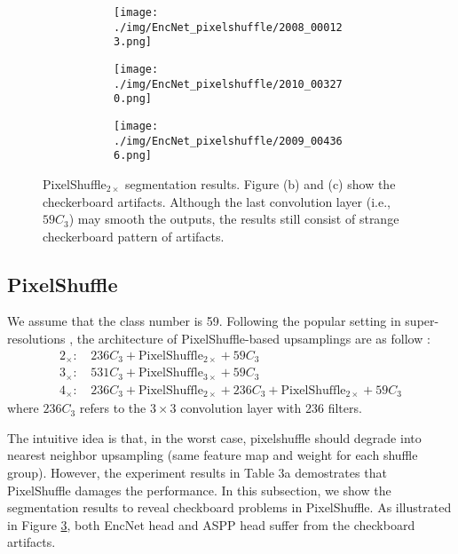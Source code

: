 \documentclass[10pt,twocolumn,letterpaper]{article}
\begin{document}
\begin{figure}[t]
\begin{subfigure}[t]{0.155\textwidth}
        \begin{subfigure}[t]{\textwidth}
                \texttt{[image: ./img/EncNet\_pixelshuffle/2008\_000123.png]}
            \end{subfigure}\vspace{.1ex}

        \begin{subfigure}[t]{\textwidth}
                \texttt{[image: ./img/EncNet\_pixelshuffle/2010\_003270.png]}
            \end{subfigure}\vspace{.1ex}

            \begin{subfigure}[t]{\textwidth}
                \texttt{[image: ./img/EncNet\_pixelshuffle/2009\_004366.png]}
	 \captionsetup{justification=centering}            
        \label{e}
            \end{subfigure}
    \end{subfigure}
        \caption{PixelShuffle$_{2\times}$ segmentation results. Figure (b) and (c) show the checkerboard artifacts. Although the last convolution layer (i.e., $59C_3$) may smooth the outputs, the results still consist of strange checkerboard pattern of artifacts.}
\label{pixleshuffle}
\end{figure}

\subsection{PixelShuffle}
We assume that the class number is 59. Following the popular setting in super-resolutions \cite{Lim_2017_CVPR_Workshops, ShiCHTABRW16, HeMWLY019}, the architecture of PixelShuffle-based upsamplings are as follow :
\begin{align*}
2_\times\text{: }&236C_3+\text{PixelShuffle}_{2\times}+59C_3\\
3_\times\text{: }&531C_3+\text{PixelShuffle}_{3\times}+59C_3\\
4_\times\text{: }&236C_3+\text{PixelShuffle}_{2\times}+236C_3+\text{PixelShuffle}_{2\times}+59C_3
\end{align*}
where $236C_3$ refers to the $3\times3$ convolution layer with 236 filters.

The intuitive idea is that, in the worst case, pixelshuffle should degrade into nearest neighbor upsampling (same feature map and weight for each shuffle group). However, the experiment results in Table 3a demostrates that PixelShuffle damages the performance. In this subsection, we show the segmentation results to reveal checkboard problems in PixelShuffle. As illustrated in Figure \ref{pixleshuffle}, both EncNet \cite{EncNet} head and ASPP \cite{ASPP} head suffer from the checkboard artifacts.
\end{document}
